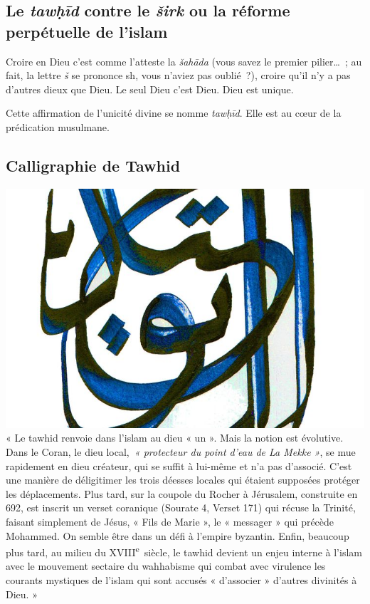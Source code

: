 \subsection{{Le \emph{tawḥīd} contre le \emph{širk}
ou la réforme perpétuelle de l'islam
}\label{le-tawux1e25ux12bd-contre-le-ux161irk-ou-la-ruxe9forme-perpuxe9tuelle-de-lislam}}

Croire en Dieu c'est comme l'atteste la \emph{šahāda} (vous savez le
premier pilier\ldots~; au fait, la lettre \emph{š} se prononce sh, vous
n'aviez pas oublié~?), croire qu'il n'y a pas d'autres dieux que Dieu.
Le seul Dieu c'est Dieu. Dieu est unique.

\begin{Def}[tawḥīd]
Cette affirmation de l'unicité
divine se nomme \emph{tawḥīd}. Elle est au cœur de la prédication
musulmane.
\end{Def}


\subsection{Calligraphie de Tawhid}

\includegraphics[width=\textwidth]{Images/image015.jpg}
« Le tawhid renvoie dans l'islam au dieu « un ». Mais la notion est
évolutive. Dans le Coran, le dieu local,~\emph{« protecteur du point
d'eau de La Mekke »}, se mue rapidement en dieu créateur, qui se suffit
à lui-même et n'a pas d'associé. C'est une manière de déligitimer les
trois déesses locales qui étaient supposées protéger les déplacements.
Plus tard, sur la coupole du Rocher à Jérusalem, construite en 692, est
inscrit un verset coranique (Sourate 4, Verset 171) qui récuse la
Trinité, faisant simplement de Jésus, « Fils de Marie », le « messager »
qui précède Mohammed. On semble être dans un défi à l'empire byzantin.
Enfin, beaucoup plus tard, au milieu du XVIII\textsuperscript{e}~siècle,
le tawhid devient un enjeu interne à l'islam avec le mouvement sectaire
du wahhabisme qui combat avec virulence les courants mystiques de
l'islam qui sont accusés « d'associer » d'autres divinités à Dieu. » 



